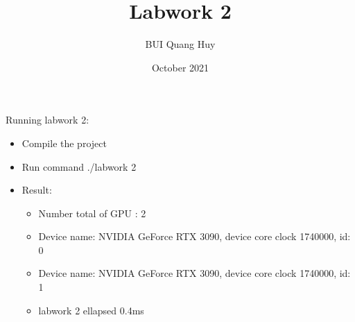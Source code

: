\documentclass{article}
\title{Labwork 2}
\author{BUI Quang Huy}
\date{October 2021}
\begin{document}
\maketitle

Running labwork 2:
\begin{itemize}
    \item Compile the project
    \item Run command ./labwork 2
    \item Result:\begin{itemize}
        \item Number total of GPU : 2
        
        \item Device name: NVIDIA GeForce RTX 3090, device core clock 1740000, id: 0
        \item Device name: NVIDIA GeForce RTX 3090, device core clock 1740000, id: 1
        \item labwork 2 ellapsed 0.4ms
    \end{itemize}
\end{itemize}
\end{document}
